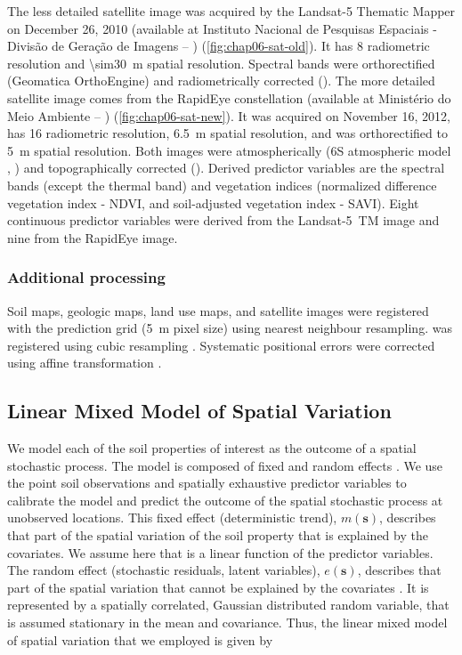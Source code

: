 The less detailed satellite image was acquired by the Landsat-\num{5} Thematic Mapper on December \num{26}, 
\num{2010} (available at Instituto Nacional de Pesquisas Espaciais - Divisão de Geração de Imagens -- 
\inpedgi) (\autoref{fig:chap06-sat-old}). It has \SI{8}{\bit} radiometric resolution and \SI{\sim30}{\m} 
spatial resolution. Spectral bands were orthorectified (Geomatica OrthoEngine) and radiometrically corrected 
(). The more detailed satellite image comes from the RapidEye constellation (available 
at Ministério do Meio Ambiente -- \mma) (\autoref{fig:chap06-sat-new}). It was acquired on November \num{16}, 
\num{2012}, has \SI{16}{\bit} radiometric resolution, \SI{6.5}{\m} spatial resolution, and was orthorectified 
to \SI{5}{\m} spatial resolution. Both images were atmospherically (6S atmospheric model 
\cite{VermoteEtAl1997}, ) and topographically corrected (). Derived 
predictor variables are the spectral bands (except the thermal band) and vegetation indices (normalized 
difference vegetation index - NDVI, and soil-adjusted vegetation index - SAVI). Eight continuous predictor 
variables were derived from the Landsat-5~TM image and nine from the RapidEye image.

\subsubsection{Additional processing}
\label{subsubsec:chap06-sources-processing}

Soil maps, geologic maps, land use maps, and satellite images were registered with the prediction grid 
(\SI{5}{\m} pixel size) using nearest neighbour resampling. \demOld{} was registered using cubic resampling 
\cite{Samuel-RosaEtAl2013c}. Systematic positional errors were corrected using affine transformation 
\cite{Samuel-RosaEtAl2014}.

\subsection{Linear Mixed Model of Spatial Variation}
\label{subsec:chap06-lmm}

We model each of the soil properties of interest as the outcome of a spatial stochastic process. The model is 
composed of fixed and random effects \cite{HeuvelinkEtAl2001, LarkEtAl2006}. We use the point soil 
observations and spatially exhaustive predictor variables to calibrate the model and predict the outcome of 
the spatial stochastic process at unobserved locations. This fixed effect (deterministic trend), 
$m(\textbf{s})$, describes that part of the spatial variation of the soil property that is explained by the 
covariates. We assume here that is a linear function of the predictor variables. The random effect (stochastic 
residuals, latent variables), $e(\textbf{s})$, describes that part of the spatial variation that cannot be 
explained by the covariates \cite{Cressie1993}. It is represented by a spatially correlated, Gaussian 
distributed random variable, that is assumed stationary in the mean and covariance. Thus, the linear mixed 
model of spatial variation that we employed is given by

